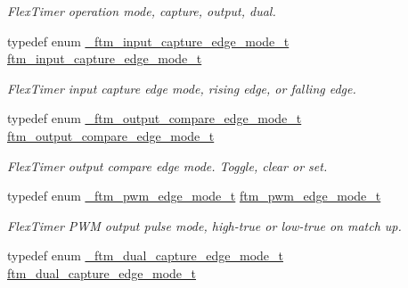 \begin{DoxyCompactItemize}
\begin{DoxyCompactList}\small\item\em Flex\+Timer operation mode, capture, output, dual. \end{DoxyCompactList}\item 
typedef enum \hyperlink{group__ftm__hal_ga9de4f09983cfb6995327d3d4df7061be}{\+\_\+ftm\+\_\+input\+\_\+capture\+\_\+edge\+\_\+mode\+\_\+t} \hyperlink{group__ftm__hal_gaa7f75061d288318028ebdfa90b27de12}{ftm\+\_\+input\+\_\+capture\+\_\+edge\+\_\+mode\+\_\+t}\hypertarget{group__ftm__hal_gaa7f75061d288318028ebdfa90b27de12}{}\label{group__ftm__hal_gaa7f75061d288318028ebdfa90b27de12}

\begin{DoxyCompactList}\small\item\em Flex\+Timer input capture edge mode, rising edge, or falling edge. \end{DoxyCompactList}\item 
typedef enum \hyperlink{group__ftm__hal_ga8d694b53bad7bd40f7c79f45ad0ea0cd}{\+\_\+ftm\+\_\+output\+\_\+compare\+\_\+edge\+\_\+mode\+\_\+t} \hyperlink{group__ftm__hal_ga025e4209539b48426a53d1351e0288a5}{ftm\+\_\+output\+\_\+compare\+\_\+edge\+\_\+mode\+\_\+t}\hypertarget{group__ftm__hal_ga025e4209539b48426a53d1351e0288a5}{}\label{group__ftm__hal_ga025e4209539b48426a53d1351e0288a5}

\begin{DoxyCompactList}\small\item\em Flex\+Timer output compare edge mode. Toggle, clear or set. \end{DoxyCompactList}\item 
typedef enum \hyperlink{group__ftm__hal_ga6cf3ca8aba3464c254e0b451f4333de9}{\+\_\+ftm\+\_\+pwm\+\_\+edge\+\_\+mode\+\_\+t} \hyperlink{group__ftm__hal_gad072678496c10bf3ebe1bba980a8ec7d}{ftm\+\_\+pwm\+\_\+edge\+\_\+mode\+\_\+t}\hypertarget{group__ftm__hal_gad072678496c10bf3ebe1bba980a8ec7d}{}\label{group__ftm__hal_gad072678496c10bf3ebe1bba980a8ec7d}

\begin{DoxyCompactList}\small\item\em Flex\+Timer P\+WM output pulse mode, high-\/true or low-\/true on match up. \end{DoxyCompactList}\item 
typedef enum \hyperlink{group__ftm__hal_ga975267f3de9c92904a6ce4d7951b5b18}{\+\_\+ftm\+\_\+dual\+\_\+capture\+\_\+edge\+\_\+mode\+\_\+t} \hyperlink{group__ftm__hal_ga5550fba8c8c9ccf1946b76e97bf497c0}{ftm\+\_\+dual\+\_\+capture\+\_\+edge\+\_\+mode\+\_\+t}\hypertarget{group__ftm__hal_ga5550fba8c8c9ccf1946b76e97bf497c0}{}\label{group__ftm__hal_ga5550fba8c8c9ccf1946b76e97bf497c0}


\end{DoxyCompactItemize}
